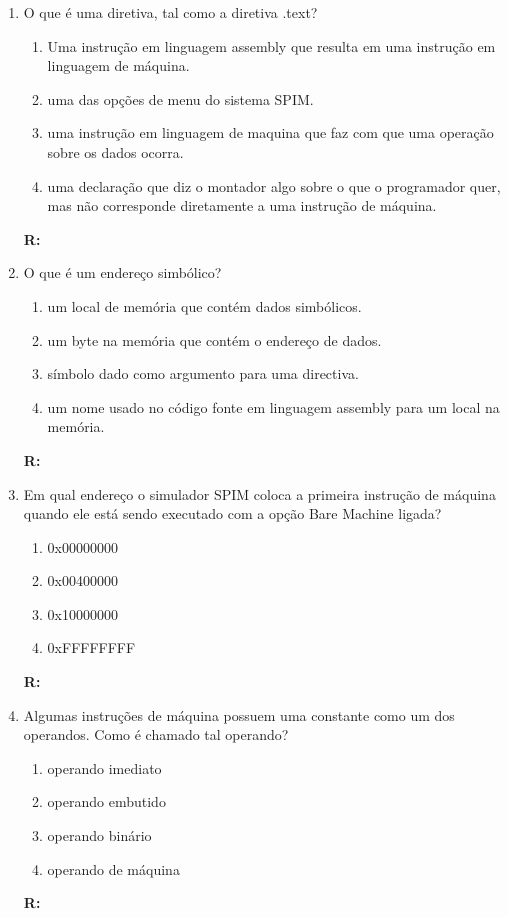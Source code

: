 \documentclass[a4paper,11pt]{article}
\begin{document}
\begin{enumerate}
    \item{O que é uma diretiva, tal como a diretiva .text?}
        \begin{enumerate}
            \item{Uma instrução em linguagem assembly que resulta em uma instrução em linguagem de
                    máquina.}
            \item{uma das opções de menu do sistema SPIM.}
            \item{uma instrução em linguagem de maquina que faz com que uma operação sobre os dados ocorra.}
            \item{uma declaração que diz o montador algo sobre o que o programador quer, mas não
                    corresponde diretamente a uma instrução de máquina.}
        \end{enumerate}
        \textbf{R:}

    \item{O que é um endereço simbólico?}
        \begin{enumerate}
            \item{um local de memória que contém dados simbólicos.}
            \item{um byte na memória que contém o endereço de dados.}
            \item{símbolo dado como argumento para uma directiva.}
            \item{um nome usado no código fonte em linguagem assembly para um local na memória.}
        \end{enumerate}
        \textbf{R:}

    \item{Em qual endereço o simulador SPIM coloca a primeira instrução de máquina quando ele está sendo
            executado com a opção Bare Machine ligada?}
        \begin{enumerate}
            \item{0x00000000}
            \item{0x00400000}
            \item{0x10000000}
            \item{0xFFFFFFFF}
        \end{enumerate}
        \textbf{R:}

    \item{Algumas instruções de máquina possuem uma constante como um dos operandos. Como é chamado tal
            operando?}
        \begin{enumerate}
            \item{operando imediato}
            \item{operando embutido}
            \item{operando binário}
            \item{operando de máquina}
        \end{enumerate}
        \textbf{R:}
        

\end{enumerate}
\end{document}

